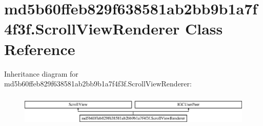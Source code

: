 \hypertarget{classmd5b60ffeb829f638581ab2bb9b1a7f4f3f_1_1ScrollViewRenderer}{}\section{md5b60ffeb829f638581ab2bb9b1a7f4f3f.\+Scroll\+View\+Renderer Class Reference}
\label{classmd5b60ffeb829f638581ab2bb9b1a7f4f3f_1_1ScrollViewRenderer}
Inheritance diagram for md5b60ffeb829f638581ab2bb9b1a7f4f3f.\+Scroll\+View\+Renderer\+:\begin{figure}[H]
\begin{center}
\leavevmode
\includegraphics[height=1.525886cm]{classmd5b60ffeb829f638581ab2bb9b1a7f4f3f_1_1ScrollViewRenderer}
\end{center}
\end{figure}
